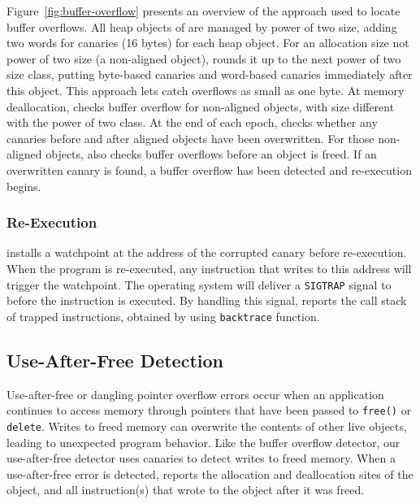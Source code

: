 Figure~\ref{fig:buffer-overflow} presents an overview of the approach used to locate buffer overflows. All heap objects of \doubletake{} are managed by power of two size, adding two words for canaries (16 bytes) for each heap object. For an allocation size not power of two size (a non-aligned object), \doubletake{} rounds it up to the next power of two size class, putting byte-based canaries and word-based canaries immediately after this object. This approach lets \doubletake{} catch overflows as small as one byte. 
At memory deallocation, \doubletake{} checks buffer overflow for non-aligned objects, with size different with the power of two class. 
At the end of each epoch, \doubletake{} checks whether any canaries before and after aligned objects have been overwritten. For those non-aligned objects, \doubletake{} also checks buffer overflows before an object is freed. If an overwritten canary is found, a buffer overflow has been detected and re-execution begins.

\subsubsection*{Re-Execution}

\doubletake{} installs a watchpoint at the address of the corrupted canary before re-execution. When the program is re-executed, any instruction that writes to this address will trigger the watchpoint. The operating system will deliver a \texttt{SIGTRAP} signal to \doubletake{} before the instruction is executed. By handling this signal, \doubletake{} reports the call stack of trapped instructions, obtained by using \texttt{backtrace} function.


\subsection{Use-After-Free Detection}
\label{sec:applications/useafterfree}
 
Use-after-free or dangling pointer overflow errors occur when an application continues to access memory through pointers that have been passed to \texttt{free()} or \texttt{delete}. Writes to freed memory can overwrite the contents of other live objects, leading to unexpected program behavior. Like the buffer overflow detector, our use-after-free detector uses canaries to detect writes to freed memory. When a use-after-free error is detected, \doubletake{} reports the allocation and deallocation sites of the object, and all instruction(s) that wrote to the object after it was freed.

